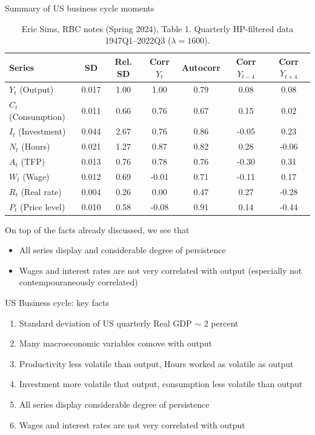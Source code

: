 \documentclass[9pt,xcolor={dvipsnames}]{beamer}
\newcommand{\bit}{\begin{itemize}}
\newcommand{\eit}{\end{itemize}}
\newcommand{\ben}{\begin{enumerate}}
\newcommand{\een}{\end{enumerate}}
\begin{document}
\begin{frame}{Summary of US business cycle moments}

\begin{table}
	\centering
	\scriptsize
	\setlength{\tabcolsep}{5pt}
	\renewcommand{\arraystretch}{1.20}
	\begin{tabular}{|l|c|c|c|c|c|c|}
		\hline
		\textbf{Series} & \textbf{SD} & \textbf{Rel. SD} & \textbf{Corr $Y_t$} & \textbf{Autocorr} & \textbf{Corr $Y_{t-4}$} & \textbf{Corr $Y_{t+4}$} \\
		\hline
		$Y_t$ (Output) & 0.017 & 1.00 & 1.00 & 0.79 & 0.08 & 0.08 \\
		$C_t$ (Consumption) & 0.011 & 0.66 & 0.76 & 0.67 & 0.15 & 0.02 \\
		$I_t$ (Investment) & 0.044 & 2.67 & 0.76 & 0.86 & -0.05 & 0.23 \\
		$N_t$ (Hours) & 0.021 & 1.27 & 0.87 & 0.82 & 0.28 & -0.06 \\
		$A_t$ (TFP) & 0.013 & 0.76 & 0.78 & 0.76 & -0.30 & 0.31 \\
		$W_t$ (Wage) & 0.012 & 0.69 & -0.01 & 0.71 & -0.11 & 0.17 \\
		$R_t$ (Real rate) & 0.004 & 0.26 & 0.00 & 0.47 & 0.27 & -0.28 \\
		$P_t$ (Price level) & 0.010 & 0.58 & -0.08 & 0.91 & 0.14 & -0.44 \\
		\hline
	\end{tabular}
	\caption*{Eric Sims, RBC notes (Spring 2024), Table 1. Quarterly HP-filtered data 1947Q1--2022Q3 (\(\lambda=1600\)).}
\end{table}

On top of the facts already discussed, we see that 
\bit
\setlength\itemsep{0.5em}
\item All series display and considerable degree of persistence

\item Wages and interest rates are not very correlated with output (especially not contempouraneously correlated)
\eit

\end{frame}

\begin{frame}{US Business cycle: key facts}

\ben
\setlength\itemsep{1.5em}
\item Standard deviation of US quarterly Real GDP $\sim$ 2 percent

\item Many macroeconomic variables comove with output

\item Productivity less volatile than output, Hours worked as volatile as output

\item Investment more volatile that output, consumption less volatile than output

\item All series display considerable degree of persistence

\item Wages and interest rates are not very correlated with output
\een

\end{frame}
\end{document}

